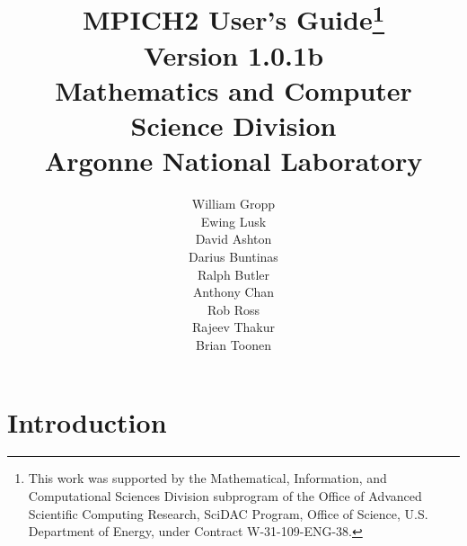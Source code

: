 \documentclass[dvipdfm,11pt]{article}
\begin{document}
\title{\textbf{MPICH2 User's Guide}\thanks{This work was supported by the Mathematical,
    Information, and Computational Sciences Division subprogram of the
    Office of Advanced Scientific Computing Research, SciDAC Program,
    Office of Science, U.S. Department of Energy, under Contract
    W-31-109-ENG-38.}\\
Version 1.0.1b\\
Mathematics and Computer Science Division\\
Argonne National Laboratory}

\author{William Gropp\\
Ewing Lusk\\
David Ashton\\
Darius Buntinas\\
Ralph Butler\\
Anthony Chan\\
Rob Ross\\
Rajeev Thakur\\
Brian Toonen}

\maketitle

\cleardoublepage

\tableofcontents
\clearpage

\pagestyle{headings}




\section{Introduction}
\label{sec:introduction}
\end{document}

